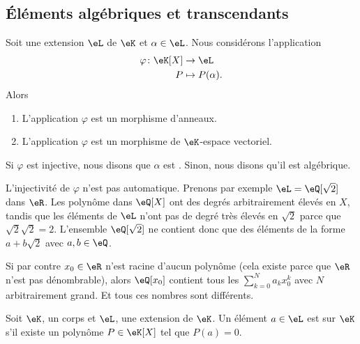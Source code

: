 \subsection{Éléments algébriques et transcendants}

\begin{lemmaDef} \label{LEMooLVPLooEkWYDN}
    Soit une extension \( \eL\) de \( \eK\) et \( \alpha\in \eL\). Nous considérons l'application
    \begin{equation}
        \begin{aligned}
            \varphi\colon \eK[X]&\to \eL \\
            P&\mapsto P(\alpha). 
        \end{aligned}
    \end{equation}
    Alors
    \begin{enumerate}
        \item
            L'application \( \varphi\) est un morphisme d'anneaux.
        \item
            L'application \( \varphi\) est un morphisme de \( \eK\)-espace vectoriel.
    \end{enumerate}
    Si \( \varphi\) est injective, nous disons que \( \alpha\) est . Sinon, nous disons qu'il est algébrique.
\end{lemmaDef}

\begin{example}
    L'injectivité de \( \varphi\) n'est pas automatique. Prenons par exemple \( \eL=\eQ[\sqrt{ 2 }]\) dans \( \eR\). Les polynôme dans \( \eQ[X]\) ont des degrés arbitrairement élevés en \( X\), tandis que les éléments de \( \eL\) n'ont pas de degré très élevés en \( \sqrt{ 2 }\) parce que \( \sqrt{ 2 }\sqrt{ 2 }=2\). L'ensemble \( \eQ[\sqrt{ 2 }]\) ne contient donc que des éléments de la forme \( a+b\sqrt{ 2 }\) avec \( a,b\in \eQ\).

    Si par contre \( x_0\in \eR\) n'est racine d'aucun polynôme (cela existe parce que \( \eR\) n'est pas dénombrable), alors \( \eQ[x_0]\) contient tous les \( \sum_{k=0}^Na_kx_0^k\) avec \( N\) arbitrairement grand. Et tous ces nombres sont différents.
\end{example}

Soit \( \eK\), un corps et \( \eL\), une extension de \( \eK\). Un élément \( a\in \eL\) est  sur \( \eK\) s'il existe un polynôme \( P\in \eK[X]\) tel que \( P(a)=0\).

